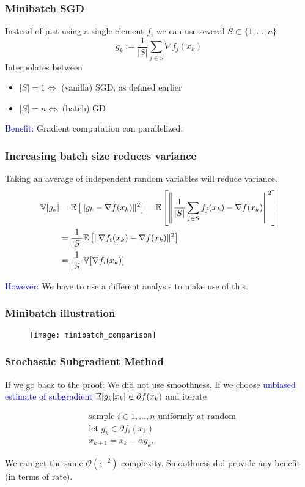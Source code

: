 \documentclass{beamer}
\begin{document}
\begin{frame}
  \frametitle{Minibatch SGD}
  Instead of just using a single element $f_i$ we can use several $S \subset \{1, \dots, n\}$
  \begin{equation}
    g_k := \frac{1}{\vert S \vert} \sum_{j\in S} \nabla f_j(x_k)
  \end{equation}
  Interpolates between
  \begin{itemize}
    \item $\vert S \vert=1 \Leftrightarrow $ (vanilla) SGD, as defined earlier
    \item $\vert S \vert= n \Leftrightarrow$ (batch) GD
  \end{itemize}

  \textcolor{blue}{Benefit:} Gradient computation can parallelized.

\end{frame}


\begin{frame}
  \frametitle{Increasing batch size reduces variance}

  Taking an average of independent random variables will reduce variance.
  \begin{align}
    \mathbb{V}[g_k] &= \mathbb{E} \left[ \Vert g_k - \nabla f(x_k) \Vert^2 \right] = \mathbb{E} \left[ \left\Vert \frac{1}{\vert S \vert} \sum_{j\in S} f_j(x_k) - \nabla f(x_k) \right\Vert^2 \right] \\
              &= \frac{1}{\vert S \vert} \mathbb{E} \left[\Vert \nabla f_i(x_k) - \nabla f(x_k) \Vert^2\right] \\
    &= \frac{1}{\vert S \vert} \mathbb{V}[ \nabla f_i(x_k) ]
  \end{align}

  \textcolor{blue}{However:} We have to use a different analysis to make use of this.
\end{frame}


\begin{frame}
  \frametitle{Minibatch illustration}
  \begin{figure}[ht]
    \centering
    \texttt{[image: minibatch\_comparison]}
  \end{figure}
\end{frame}


\begin{frame}
  \frametitle{Stochastic Subgradient Method}
  If we go back to the proof: We did not use smoothness. If we choose \textcolor{blue}{unbiased estimate of subgradient} $\mathbb{E}[g_k|x_k] \in \partial f(x_k)$ and iterate
  \begin{block}{}
    \begin{align}
      &\text{sample $i\in 1,\dots, n$ uniformly at random} \\
      &\text{let $g_k \in \partial f_i(x_k)$}\\
      &x_{k+1} = x_k - \alpha g_k.
    \end{align}
  \end{block}
  We can get the same $\mathcal{O}(\epsilon^{-2})$ complexity. Smoothness did provide any benefit (in terms of rate).
\end{frame}
\end{document}
